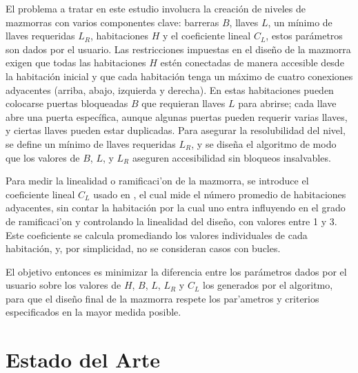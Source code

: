 \documentclass[letter, 10pt]{article}
\begin{document}
El problema a tratar en este estudio involucra la creaci\'on de niveles de mazmorras con varios componentes clave: barreras $B$, llaves $L$, un m\'inimo de llaves requeridas $L_R$, habitaciones $H$ y el coeficiente lineal $C_L$, estos par\'ametros son dados por el usuario. Las restricciones impuestas en el dise\~no de la mazmorra exigen que todas las habitaciones $H$ est\'en conectadas de manera accesible desde la habitaci\'on inicial y que cada habitaci\'on tenga un m\'aximo de cuatro conexiones adyacentes (arriba, abajo, izquierda y derecha). En estas habitaciones pueden colocarse puertas bloqueadas $B$ que requieran llaves $L$ para abrirse; cada llave abre una puerta espec\'ifica, aunque algunas puertas pueden requerir varias llaves, y ciertas llaves pueden estar duplicadas. Para asegurar la resolubilidad del nivel, se define un m\'inimo de llaves requeridas $L_R$, y se dise\~na el algoritmo de modo que los valores de $B$, $L$, y $L_R$ aseguren accesibilidad sin bloqueos insalvables.

Para medir la linealidad o ramificaci'on de la mazmorra, se introduce el coeficiente lineal $C_L$ usado en \cite{Dumont2024}, el cual mide el n\'umero promedio de habitaciones adyacentes, sin contar la habitaci\'on por la cual uno entra influyendo en el grado de ramificaci'on y controlando la linealidad del dise\~no, con valores entre 1 y 3. Este coeficiente se calcula promediando los valores individuales de cada habitaci\'on, y, por simplicidad, no se consideran casos con bucles.

El objetivo entonces es minimizar la diferencia entre los par\'ametros dados por el usuario sobre los valores de $H$, $B$, $L$, $L_R$ y $C_L$ los generados por el algoritmo, para que el dise\~no final de la mazmorra respete los par'ametros y criterios especificados en la mayor medida posible.

\section{Estado del Arte}
\end{document}
